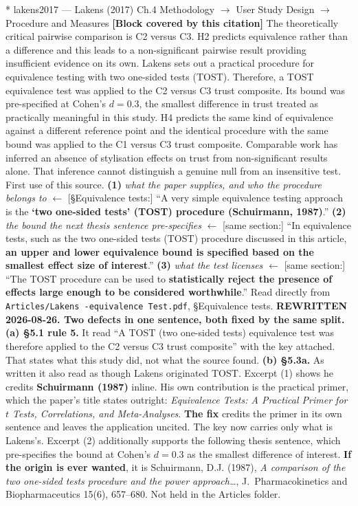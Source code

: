 \documentclass[11pt, a4paper]{article}
\makeatletter
\newcounter{citentry}
\newcommand{\citentry@core}[7]{%
  \stepcounter{citentry}
  \begingroup
  \sbox{\citentry@measurebox}{%
    \begin{minipage}{\linewidth}
      \noindent\colorbox{konstanzblue}{\parbox{\dimexpr\linewidth-2\fboxsep}{%
        \vspace{3pt}
        \textbf{\#\thecitentry \quad #2} \hfill \textit{#3}
        \vspace{3pt}
      }}
      \vspace{3pt}
      \noindent\begin{tabular}{@{}p{2.7cm} p{\dimexpr\linewidth-3cm}@{}}
        \textit{\small Sentence in thesis:} & #4 \\[5pt]
        \textbf{Usage:}\hfill       & #5 \\[5pt]
        \textit{\small Original source:}     & #6 \\[5pt]
        \textbf{How to check:}             & #7 \\
      \end{tabular}
      \vspace{5pt}
      \rule{10pt}{10pt}\quad \textbf{Validated} --- I have read the original and agree it supports the sentence.
    \end{minipage}%
  }%
  \Needspace{\dimexpr\ht\citentry@measurebox+\dp\citentry@measurebox\relax}%
  \endgroup
  \vspace{10pt}
  \noindent\colorbox{konstanzblue}{\parbox{\dimexpr\linewidth-2\fboxsep}{%
    \vspace{3pt}
    \textcolor{white}{\textbf{\#\thecitentry \quad #2}} \hfill \textcolor{white}{\textit{#3}}
    \vspace{3pt}
  }}
  \vspace{3pt}
  \noindent\begin{tabular}{@{}p{2.7cm} p{\dimexpr\linewidth-3cm}@{}}
    \textit{\small Sentence in thesis:} & \textcolor{darkgreen}{#4} \\[5pt]
    \textbf{Usage:}\hfill       & #5 \\[5pt]
    \textit{\small Original source:}     & \textcolor{darkred}{#6} \\[5pt]
    \textbf{How to check:}             & #7 \\
  \end{tabular}
  \vspace{5pt}
  \noindent\CheckBox[name=verified\thecitentry, width=10pt, height=10pt, bordercolor={0 0 0}, borderwidth=0.75, backgroundcolor={1 1 1}#1]{}\quad \textbf{Validated} --- I have read the original and agree it supports the sentence.
  \vspace{3pt}
  \noindent\textcolor{midgray}{\rule{\linewidth}{0.4pt}}
}
\newcommand{\citentry}{\@ifstar{\citentry@core{, checked}}{\citentry@core{}}}
\makeatother
\begin{document}
\begin{Form}
\citentry*
  {lakens2017 --- Lakens (2017)}
  {Ch.4 Methodology $\rightarrow$ User Study Design $\rightarrow$ Procedure and Measures}
  {\textbf{[Block covered by this citation]} The theoretically critical pairwise comparison is C2 versus C3. H2 predicts equivalence rather than a difference and this leads to a non-significant pairwise result providing insufficient evidence on its own. Lakens sets out a practical procedure for equivalence testing with two one-sided tests (TOST). Therefore, a TOST equivalence test was applied to the C2 versus C3 trust composite. Its bound was pre-specified at Cohen's $d = 0.3$, the smallest difference in trust treated as practically meaningful in this study. H4 predicts the same kind of equivalence against a different reference point and the identical procedure with the same bound was applied to the C1 versus C3 trust composite. Comparable work has inferred an absence of stylisation effects on trust from non-significant results alone. That inference cannot distinguish a genuine null from an insensitive test.}
  {First use of this source.}
  {\textbf{(1)} \emph{what the paper supplies, and who the procedure belongs to} $\leftarrow$ [\S Equivalence tests:] ``A very simple equivalence testing approach is the \textbf{`two one-sided tests' (TOST) procedure (Schuirmann, 1987)}.'' \quad \textbf{(2)} \emph{the bound the next thesis sentence pre-specifies} $\leftarrow$ [same section:] ``In equivalence tests, such as the two one-sided tests (TOST) procedure discussed in this article, \textbf{an upper and lower equivalence bound is specified based on the smallest effect size of interest}.'' \quad \textbf{(3)} \emph{what the test licenses} $\leftarrow$ [same section:] ``The TOST procedure can be used to \textbf{statistically reject the presence of effects large enough to be considered worthwhile}.''}
  {Read directly from \texttt{\footnotesize Articles/Lakens -equivalence Test.pdf}, \S Equivalence tests. \textbf{REWRITTEN 2026-08-26. Two defects in one sentence, both fixed by the same split.} \textbf{(a) \S5.1 rule 5.} It read ``A TOST (two one-sided tests) equivalence test was therefore applied to the C2 versus C3 trust composite'' with the key attached. That states what this study did, not what the source found. \textbf{(b) \S5.3a.} As written it also read as though Lakens originated TOST. Excerpt (1) shows he credits \textbf{Schuirmann (1987)} inline. His own contribution is the practical primer, which the paper's title states outright: \emph{Equivalence Tests: A Practical Primer for $t$ Tests, Correlations, and Meta-Analyses}. \textbf{The fix} credits the primer in its own sentence and leaves the application uncited. The key now carries only what is Lakens's. Excerpt (2) additionally supports the following thesis sentence, which pre-specifies the bound at Cohen's $d = 0.3$ as the smallest difference of interest. \textbf{If the origin is ever wanted}, it is Schuirmann, D.J. (1987), \emph{A comparison of the two one-sided tests procedure and the power approach\ldots}, J.\ Pharmacokinetics and Biopharmaceutics 15(6), 657--680. Not held in the Articles folder.}


\end{Form}
\end{document}
